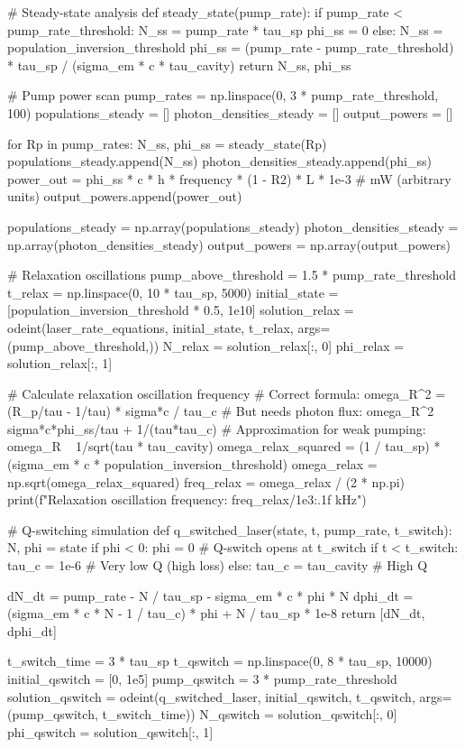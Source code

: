 \documentclass[a4paper, 11pt]{article}
\begin{document}
\begin{pycode}
# Steady-state analysis
def steady_state(pump_rate):
    if pump_rate < pump_rate_threshold:
        N_ss = pump_rate * tau_sp
        phi_ss = 0
    else:
        N_ss = population_inversion_threshold
        phi_ss = (pump_rate - pump_rate_threshold) * tau_sp / (sigma_em * c * tau_cavity)
    return N_ss, phi_ss

# Pump power scan
pump_rates = np.linspace(0, 3 * pump_rate_threshold, 100)
populations_steady = []
photon_densities_steady = []
output_powers = []

for Rp in pump_rates:
    N_ss, phi_ss = steady_state(Rp)
    populations_steady.append(N_ss)
    photon_densities_steady.append(phi_ss)
    power_out = phi_ss * c * h * frequency * (1 - R2) * L * 1e-3  # mW (arbitrary units)
    output_powers.append(power_out)

populations_steady = np.array(populations_steady)
photon_densities_steady = np.array(photon_densities_steady)
output_powers = np.array(output_powers)

# Relaxation oscillations
pump_above_threshold = 1.5 * pump_rate_threshold
t_relax = np.linspace(0, 10 * tau_sp, 5000)
initial_state = [population_inversion_threshold * 0.5, 1e10]
solution_relax = odeint(laser_rate_equations, initial_state, t_relax, args=(pump_above_threshold,))
N_relax = solution_relax[:, 0]
phi_relax = solution_relax[:, 1]

# Calculate relaxation oscillation frequency
# Correct formula: omega_R^2 = (R_p/tau - 1/tau) * sigma*c / tau_c
# But needs photon flux: omega_R^2 ~ sigma*c*phi_ss/tau + 1/(tau*tau_c)
# Approximation for weak pumping: omega_R ~ 1/sqrt(tau * tau_cavity)
omega_relax_squared = (1 / tau_sp) * (sigma_em * c * population_inversion_threshold)
omega_relax = np.sqrt(omega_relax_squared)
freq_relax = omega_relax / (2 * np.pi)
print(f"Relaxation oscillation frequency: {freq_relax/1e3:.1f} kHz")

# Q-switching simulation
def q_switched_laser(state, t, pump_rate, t_switch):
    N, phi = state
    if phi < 0:
        phi = 0
    # Q-switch opens at t_switch
    if t < t_switch:
        tau_c = 1e-6  # Very low Q (high loss)
    else:
        tau_c = tau_cavity  # High Q

    dN_dt = pump_rate - N / tau_sp - sigma_em * c * phi * N
    dphi_dt = (sigma_em * c * N - 1 / tau_c) * phi + N / tau_sp * 1e-8
    return [dN_dt, dphi_dt]

t_switch_time = 3 * tau_sp
t_qswitch = np.linspace(0, 8 * tau_sp, 10000)
initial_qswitch = [0, 1e5]
pump_qswitch = 3 * pump_rate_threshold
solution_qswitch = odeint(q_switched_laser, initial_qswitch, t_qswitch, args=(pump_qswitch, t_switch_time))
N_qswitch = solution_qswitch[:, 0]
phi_qswitch = solution_qswitch[:, 1]


\end{pycode}
\end{document}

